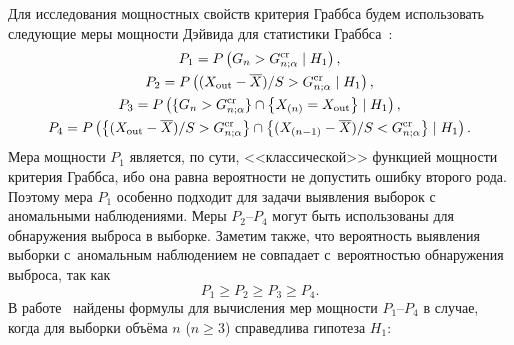 Для исследования мощностных свойств критерия Граббса будем использовать следующие меры мощности Дэйвида для статистики Граббса~\cite{Dav}:
\begin{gather*}
P_{1}= P\left(G_{n}>G_{n;\alpha}^{\rm cr} \mid H_1 \right),
\\
P_{2}=P\left((X_{\rm out}-\overline{X})/S>G_{n;\alpha}^{\rm cr}\mid H_1\right),
\\
P_{3}=P\left(\{G_{n}>G_{n;\alpha}^{\rm cr}\}\cap\left\{X_{(n)}=X_{\rm out}\right\}\mid H_1\right),
\\
P_{4}=P 
\left(
\left\{(X_{\rm out}-\overline{X})/S>G_{n;\alpha}^{\rm cr} \right\}\cap
\left\{(X_{(n-1)}-\overline{X})/S<G_{n;\alpha}^{\rm cr} \right\} \mid H_1 \right).
\end{gather*}
 Мера мощности $P_{1}$ является, по сути,  <<клас\-си\-чес\-кой>>  функ\-ци\-ей мощности критерия Граббса, ибо она равна вероятности не допустить ошибку второго рода. Поэтому   мера $P_{1}$ особенно подходит для задачи выявления выборок  с аномальными наблюдениями. Меры $P_{2}$--$P_{4}$ могут быть использованы для обнаружения выброса в выборке.
 Заметим также, что вероятность выявления выборки с~аномальным наблюдением не совпадает с~вероятностью обнаружения выброса, так как~\cite{Dav}
\begin{equation}\label{Nerav}
P_{1}\ge P_2\ge P_{3}\ge P_4.
\end{equation}
В работе~\cite{Shir} найдены формулы для вычисления
мер мощности $P_{1}$--$P_4$ в случае, когда  для выборки объёма $n$ ($n\ge 3$) справедлива гипотеза $H_1$:
